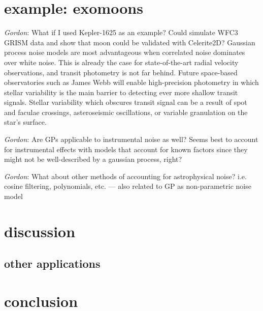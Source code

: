 \documentclass[modern]{aastex62}
\newcommand{\todo}[3]{{\color{#2}\emph{#1}: #3}}
\newcommand{\gordontodo}[1]{\todo{Gordon}{red}{#1}}
\begin{document}
\section{example: exomoons}
	\gordontodo{What if I used Kepler-1625 as an example? Could simulate WFC3 GRISM data and show that moon could be validated with Celerite2D?}
	Gaussian process noise models are most advantageous when correlated noise dominates over white noise. 
	This is already the case for state-of-the-art radial velocity observations, and transit 
	photometry is not far behind. Future space-based observatories such as James Webb 
	will enable high-precision photometry in which stellar variability is the main barrier to detecting ever more shallow transit signals. 
	Stellar variability which obscures transit signal can be a result of spot and faculae crossings, asteroseismic oscillations, or variable 
	granulation on the star's surface. 
	
	\gordontodo{Are GPs applicable to instrumental noise as well? Seems best to account for instrumental effects with models that account for known factors since 
	they might not be well-described by a gaussian process, right?}
	
	\gordontodo{What about other methods of accounting for astrophysical noise? i.e. cosine filtering, polynomials, etc. --- also related to GP as non-parametric 
	noise model}

\section{discussion}
	\subsection{other applications}

\section{conclusion}

\acknowledgments

%
\end{document}
